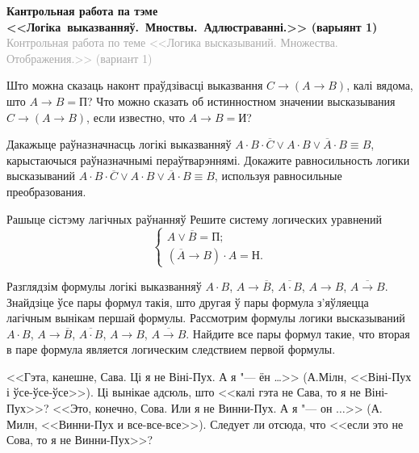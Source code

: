 


	
\begin{center}
	\textbf{Кантрольная работа па тэме <<Логіка~выказванняў.~Мноствы.~Адлюстраванні.>> (варыянт 1)} \\
	{\small \textcolor{darkgray}{Контрольная работа по теме <<Логика высказываний. Множества. Отображения.>> (вариант 1)}}
\end{center}

\begin{problemList}
	
\problemItemSimple
{Што можна сказаць наконт праўдзівасці выказвання  $C \to (A \to B)$, калі вядома, што $A \to B = \mbox{П}$?}
{Что можно сказать об истинностном значении высказывания $C \to (A \to B)$, если известно, что $A \to B = \mbox{И}$?}
	
\problemItemSimple
{Дакажыце раўназначнасць логікі выказванняў $A \cdot B \cdot \overline{C} \vee A \cdot B \vee \overline{A} \cdot B \equiv B$, карыстаючыся раўназначнымі пераўтварэннямі.}
{Докажите равносильность логики высказываний $A \cdot B \cdot \overline{C} \vee A \cdot B \vee \overline{A} \cdot B \equiv B$, используя равносильные преобразования.}

\problemItemWithCommonPart
{Рашыце сістэму лагічных раўнанняў}
{Решите систему логических уравнений}
{\[\begin{cases} A \vee \overline{B} = \mbox{П}; \\ (\overline{A} \to B) \cdot A = \mbox{Н}. \end{cases}\]}

\problemItemSimple
{Разглядзім формулы логікі выказванняў $A \cdot B$, $A \to \overline{B}$, $\overline{A \cdot B}$, $A \to B$, $\overline{A \to B}$. Знайдзіце ўсе пары формул такія, што другая ў пары формула з'яўляецца лагічным вынікам першай формулы.}
{Рассмотрим формулы логики высказываний $A \cdot B$, $A \to \overline{B}$, $\overline{A \cdot B}$, $A \to B$, $\overline{A \to B}$. Найдите все пары формул такие, что вторая в паре формула является логическим следствием первой формулы.}

\problemItemSimple
{<<Гэта, канешне, Сава. Ці я не Віні-Пух. А я "--- ён \dots>> (А.Мілн, <<Віні-Пух і ўсе-ўсе-ўсе>>). Ці вынікае адсюль, што <<калі гэта не Сава, то я не Віні-Пух>>?}
{<<Это, конечно, Сова. Или я не Винни-Пух. А я "--- он $\ldots$>> (А. Милн, <<Винни-Пух и все-все-все>>). Следует ли отсюда, что <<если это не Сова, то я не Винни-Пух>>?}


\end{problemList}
